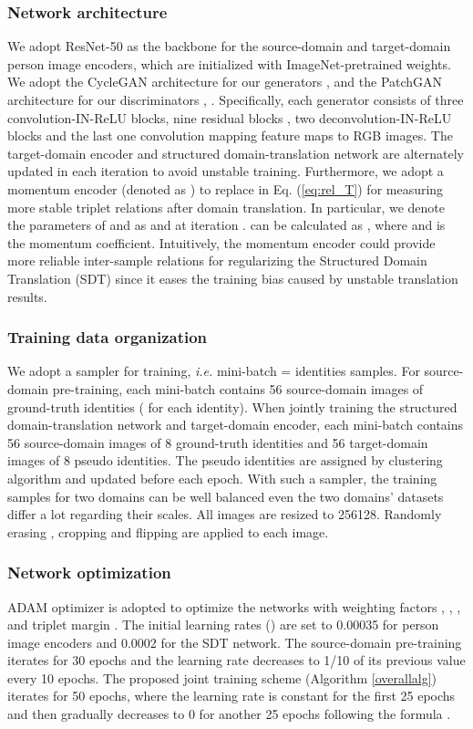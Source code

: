 \documentclass[journal]{IEEEtran}
\begin{document}
\subsubsection{\textbf{Network architecture}}
We adopt ResNet-50 \cite{he2016deep} as the backbone for the source-domain and target-domain person image encoders, which are initialized with ImageNet-pretrained \cite{deng2009imagenet} weights.
 {We adopt the CycleGAN \cite{zhu2017unpaired} architecture for our generators ,  and the PatchGAN \cite{isola2017image} architecture for our discriminators , . Specifically, each generator consists of three convolution-IN-ReLU blocks, nine residual blocks \cite{he2016deep},  two deconvolution-IN-ReLU blocks and the last one convolution mapping feature maps to RGB images.}
The target-domain encoder  and structured domain-translation network are alternately updated in each iteration to avoid unstable training.
Furthermore, we adopt a momentum encoder \cite{he2019momentum} (denoted as )
to replace  in Eq. (\ref{eq:rel_T}) for measuring more stable triplet relations after domain translation.
In particular,
we denote the parameters of  and  as  and  at iteration .
 can be calculated as , where  and  is the momentum coefficient.
Intuitively, the momentum encoder could provide more reliable inter-sample relations for regularizing the Structured Domain Translation (SDT) since it eases the training bias caused by unstable translation results.


\subsubsection{\textbf{Training data organization}}
 {We adopt a  sampler for training, \textit{i.e.} mini-batch =  identities   samples. For source-domain pre-training, each mini-batch contains 56 source-domain images of  ground-truth identities ( for each identity). When jointly training the structured domain-translation network and target-domain encoder,}
each mini-batch contains 56 source-domain images of 8 ground-truth identities and 56 target-domain images of 8 pseudo identities.
The pseudo identities are assigned by clustering algorithm and updated before each epoch.
 {With such a  sampler, the training samples for two domains can be well balanced even the two domains' datasets differ a lot regarding their scales.}
All images are resized to 256128.
Randomly erasing \cite{zhong2017random}, cropping and flipping are applied to each image.

\subsubsection{\textbf{Network optimization}}
ADAM optimizer is adopted to optimize the networks with weighting factors , , ,  and triplet margin .
The initial learning rates () are set to 0.00035 for person image encoders and 0.0002 for the SDT network.
The source-domain pre-training iterates for 30 epochs and the learning rate decreases to 1/10 of its previous value every 10 epochs.
The proposed joint training scheme (Algorithm \ref{overallalg}) iterates for 50 epochs,
where the learning rate is constant for the first 25 epochs and then gradually decreases to 0 for another 25 epochs following the formula .
\end{document}
